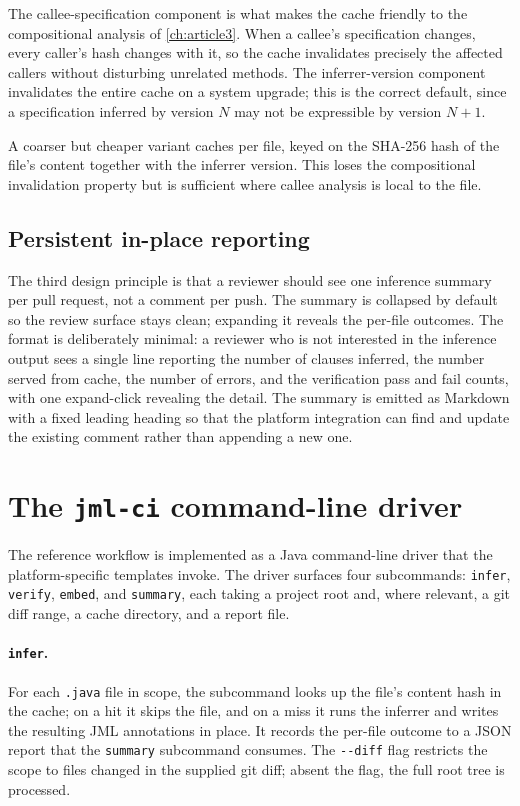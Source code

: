The callee-specification component is what makes the cache friendly to the
compositional analysis of \cref{ch:article3}. When a callee's specification
changes, every caller's hash changes with it, so the cache invalidates precisely
the affected callers without disturbing unrelated methods. The inferrer-version
component invalidates the entire cache on a system upgrade; this is the correct
default, since a specification inferred by version $N$ may not be expressible by
version $N{+}1$.

A coarser but cheaper variant caches per file, keyed on the SHA-256 hash of the
file's content together with the inferrer version. This loses the compositional
invalidation property but is sufficient where callee analysis is local to the
file.

\subsection{Persistent in-place reporting}

The third design principle is that a reviewer should see one inference summary per
pull request, not a comment per push. The summary is collapsed by default so the
review surface stays clean; expanding it reveals the per-file outcomes. The format
is deliberately minimal: a reviewer who is not interested in the inference output
sees a single line reporting the number of clauses inferred, the number served
from cache, the number of errors, and the verification pass and fail counts, with
one expand-click revealing the detail. The summary is emitted as Markdown with a
fixed leading heading so that the platform integration can find and update the
existing comment rather than appending a new one.

\section{The \texttt{jml-ci} command-line driver}
\label{sec:ci-cli}

The reference workflow is implemented as a Java command-line driver that the
platform-specific templates invoke. The driver surfaces four subcommands:
\texttt{infer}, \texttt{verify}, \texttt{embed}, and \texttt{summary}, each
taking a project root and, where relevant, a git diff range, a cache directory,
and a report file.

\paragraph{\texttt{infer}.} For each \texttt{.java} file in scope, the subcommand
looks up the file's content hash in the cache; on a hit it skips the file, and on
a miss it runs the inferrer and writes the resulting JML annotations in place. It
records the per-file outcome to a JSON report that the \texttt{summary} subcommand
consumes. The \texttt{-{}-diff} flag restricts the scope to files changed in the
supplied git diff; absent the flag, the full root tree is processed.

